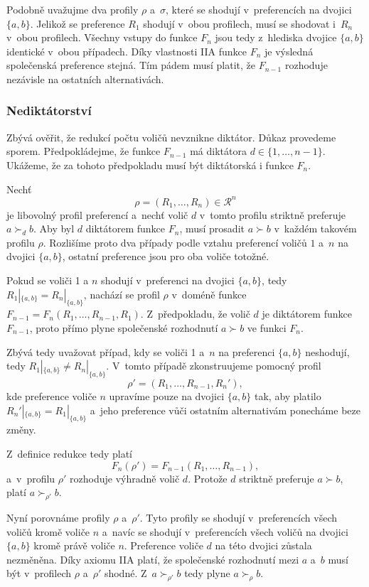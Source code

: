 \documentclass[a4paper, 11pt]{article}
\begin{document}
Podobně uvažujme dva profily $\rho$ a~$\sigma$, které se shodují v~preferencích na dvojici $\{a, b\}$.
Jelikož se preference $R_1$ shodují v~obou profilech, musí se shodovat i~$R_n$ v~obou profilech.
Všechny vstupy do funkce $F_n$ jsou tedy z~hlediska dvojice $\{a, b\}$ identické v~obou případech.
Díky vlastnosti IIA funkce $F_n$ je výsledná společenská preference stejná.
Tím pádem musí platit, že $F_{n-1}$ rozhoduje nezávisle na ostatních alternativách.

\subsubsection*{Nediktátorství}

Zbývá ověřit, že redukcí počtu voličů nevznikne diktátor.
Důkaz provedeme sporem.
Předpokládejme, že funkce $F_{n-1}$ má diktátora $d \in \{1,\dots,n-1\}$.
Ukážeme, že za tohoto předpokladu musí být diktátorská i funkce $F_n$.

Nechť
\[
    \rho = (R_1,\dots,R_n) \in \mathcal{R}^n
\]
je libovolný profil preferencí a~nechť volič $d$ v~tomto profilu striktně preferuje $a \succ_d b$.
Aby byl $d$ diktátorem funkce $F_n$, musí prosadit $a \succ b$ v~každém takovém profilu $\rho$.
Rozlišíme proto dva případy podle vztahu preferencí voličů $1$ a~$n$ na dvojici $\{a,b\}$, ostatní preference jsou pro oba voliče totožné.

Pokud se voliči 1 a $n$ shodují v~preferenci na dvojici $\{a, b\}$, tedy $R_1|_{\{a,b\}} = R_n|_{\{a,b\}}$, nachází se profil $\rho$ v~doméně funkce $F_{n-1} = F_n(R_1,\dots,R_{n-1},R_1)$.
Z~předpokladu, že volič $d$ je diktátorem funkce $F_{n-1}$, proto přímo plyne společenské rozhodnutí $a \succ b$ ve funkci $F_n$.

Zbývá tedy uvažovat případ, kdy se voliči 1 a~$n$ na preferenci $\{a, b\}$ neshodují, tedy $R_1|_{\{a,b\}} \ne R_n|_{\{a,b\}}$.
V~tomto případě zkonstruujeme pomocný profil
\[
    \rho' = (R_1,\dots,R_{n-1},R_n'),
\]
kde preference voliče $n$ upravíme pouze na dvojici $\{a,b\}$ tak, aby platilo $R_n'|_{\{a,b\}} = R_1|_{\{a,b\}}$ a~jeho preference vůči ostatním alternativám ponecháme beze změny.

Z~definice redukce tedy platí
\[
    F_n(\rho') = F_{n-1}(R_1,\dots,R_{n-1}),
\]
a~v~profilu $\rho'$ rozhoduje výhradně volič $d$.
Protože $d$ striktně preferuje $a \succ b$, platí $a \succ_{\rho'} b$.

Nyní porovnáme profily $\rho$ a~$\rho'$.
Tyto profily se shodují v~preferencích všech voličů kromě voliče $n$ a~navíc se shodují v~preferencích všech voličů na dvojici $\{a,b\}$ kromě právě voliče $n$.
Preference voliče $d$ na této dvojici zůstala nezměněna.
Díky axiomu IIA platí, že společenské rozhodnutí mezi $a$ a~$b$ musí být v~profilech $\rho$ a~$\rho'$ shodné.
Z~$a \succ_{\rho'} b$ tedy plyne $a \succ_{\rho} b$.
\end{document}
